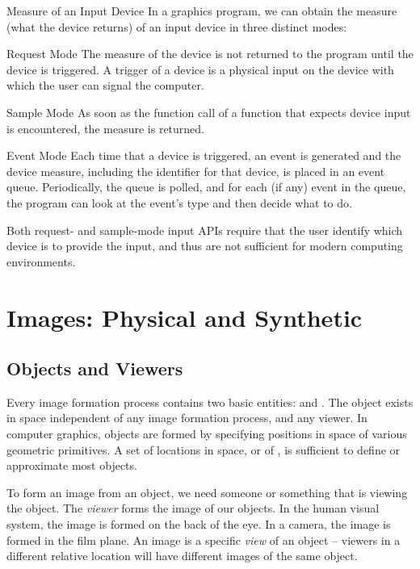\documentclass[../COS3712_Notes.tex]{subfiles}
\begin{document}
        \begin{sidenote}{Measure of an Input Device}
          In a graphics program, we can obtain the measure (what the device returns)
          of an input device in three distinct modes:
          \begin{descriptenum}[nosep]
            \item[Request Mode] The measure of the device is not returned to the program
              until the device is triggered.
              A trigger of a device is a physical input on the device with which the user
              can signal the computer.
            \item[Sample Mode] As soon as the function call of a function that expects device input
              is encountered, the measure is returned.
            \item[Event Mode] Each time that a device is triggered, an event is generated
              and the device measure, including the identifier for that device,
              is placed in an event queue.
              Periodically, the queue is polled, and for each (if any) event in the queue,
              the program can look at the event's type and then decide what to do.
          \end{descriptenum}
          Both request- and sample-mode input APIs require that the user identify which device
          is to provide the input, and thus are not sufficient for modern computing environments.
        \end{sidenote}

    \section{Images: Physical and Synthetic}
      \subsection{Objects and Viewers}
        Every image formation process contains two basic entities:
         and .
        The object exists in space independent of any image formation process, and any viewer.
        In computer graphics, objects are formed by specifying positions in space of various
        geometric primitives.
        A set of locations in space, or of , is sufficient to define or
        approximate most objects.

        To form an image from an object, we need someone or something that is viewing the object.
        The \emph{viewer} forms the image of our objects.
        In the human visual system, the image is formed on the back of the eye.
        In a camera, the image is formed in the film plane.
        An image is a specific \emph{view} of an object -- viewers in a different relative
        location will have different images of the same object.
\end{document}
